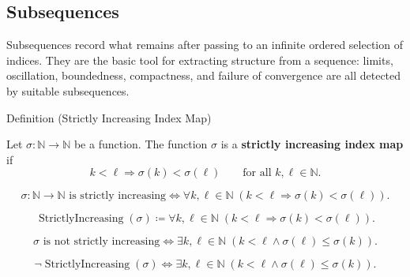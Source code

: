 \subsection*{Subsequences}

\begin{exposition}
Subsequences record what remains after passing to an infinite ordered selection
of indices. They are the basic tool for extracting structure from a sequence:
limits, oscillation, boundedness, compactness, and failure of convergence are
all detected by suitable subsequences.
\end{exposition}


\begin{definitionbox}{Definition (Strictly Increasing Index Map)}
\begin{definition}
\label{def:strictly-increasing-index-map}
Let $\sigma:\mathbb{N}\to\mathbb{N}$ be a function. The function $\sigma$
is a \textbf{strictly increasing index map} if
\[
  k<\ell \Longrightarrow \sigma(k)<\sigma(\ell)
  \qquad
  \text{for all } k,\ell\in\mathbb{N}.
\]
\end{definition}
\end{definitionbox}

\begin{remark*}
\[
\sigma:\mathbb{N}\to\mathbb{N}\text{ is strictly increasing}
\Longleftrightarrow
\forall k,\ell\in\mathbb{N}\;(k<\ell\Longrightarrow \sigma(k)<\sigma(\ell)).
\]
\end{remark*}

\begin{remark*}
\[
\operatorname{StrictlyIncreasing}(\sigma)
\coloneqq
\forall k,\ell\in\mathbb{N}\;(k<\ell\Longrightarrow \sigma(k)<\sigma(\ell)).
\]
\end{remark*}

\begin{remark*}
\[
\sigma\text{ is not strictly increasing}
\Longleftrightarrow
\exists k,\ell\in\mathbb{N}\;(k<\ell\land \sigma(\ell)\le \sigma(k)).
\]
\end{remark*}

\begin{remark*}
\[
\neg\operatorname{StrictlyIncreasing}(\sigma)
\Longleftrightarrow
\exists k,\ell\in\mathbb{N}\;(k<\ell\land \sigma(\ell)\le \sigma(k)).
\]
\end{remark*}

